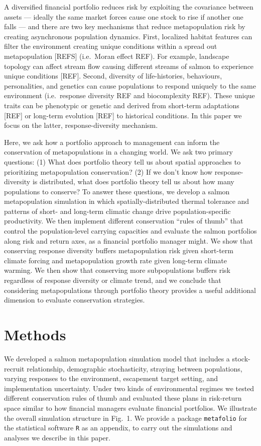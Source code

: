A diversified financial portfolio reduces risk by exploiting the covariance between assets --- ideally the same market forces cause one stock to rise if another one falls --- and there are two key mechanisms that reduce metapopulation risk by creating asynchronous population dynamics. First, localized habitat features can filter the environment creating unique conditions within a spread out metapopulation {[}REFS{]} (i.e.~Moran effect REF). For example, landscape topology can affect stream flow causing different streams of salmon to experience unique conditions {[}REF{]}. Second, diversity of life-histories, behaviours, personalities, and genetics can cause populations to respond uniquely to the same environment (i.e.~response diversity REF and biocomplexity REF). These unique traits can be phenotypic or genetic and derived from short-term adaptations {[}REF{]} or long-term evolution {[}REF{]} to historical conditions. In this paper we focus on the latter, response-diversity mechanism.

Here, we ask how a portfolio approach to management can inform the conservation of metapopulations in a changing world. We ask two primary questions: (1) What does portfolio theory tell us about spatial approaches to prioritizing metapopulation conservation? (2) If we don't know how response-diversity is distributed, what does portfolio theory tell us about how many populations to conserve? To answer these questions, we develop a salmon metapopulation simulation in which spatially-distributed thermal tolerance and patterns of short- and long-term climatic change drive population-specific productivity. We then implement different conservation ``rules of thumb'' that control the population-level carrying capacities and evaluate the salmon portfolios along risk and return axes, as a financial portfolio manager might. We show that conserving response diversity buffers metapopulation risk given short-term climate forcing and metapopulation growth rate given long-term climate warming. We then show that conserving more subpopulations buffers risk regardless of response diversity or climate trend, and we conclude that considering metapopulations through portfolio theory provides a useful additional dimension to evaluate conservation strategies.

\section{Methods}

We developed a salmon metapopulation simulation model that includes a stock-recruit relationship, demographic stochasticity, straying between populations, varying responses to the environment, escapement target setting, and implementation uncertainty. Under two kinds of environmental regimes we tested different conservation rules of thumb and evaluated these plans in risk-return space similar to how financial managers evaluate financial portfolios. We illustrate the overall simulation structure in Fig.~1. We provide a package \texttt{metafolio} for the statistical software \texttt{R} \citep{r2013} as an appendix, to carry out the simulations and analyses we describe in this paper.

